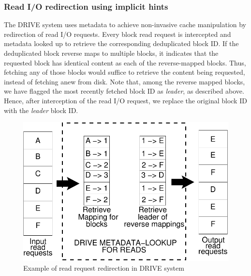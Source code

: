 
\subsubsection{Read I/O redirection using implicit hints}
The DRIVE system uses metadata to achieve non-invasive
cache manipulation by redirection of read I/O requests. Every block read
request is intercepted and metadata looked up to retrieve the corresponding
deduplicated block ID. If the
deduplicated block reverse maps to multiple blocks, it indicates that the 
requested block has identical content as each of the reverse-mapped blocks.
Thus, fetching any of those blocks would suffice to retrieve the content 
being requested, instead of fetching anew from disk. Note that, among the 
reverse mapped blocks, we have flagged the most recently fetched block ID as 
\textit{leader}, as described above. Hence, after interception of the read 
I/O request, we replace the original block ID with the \textit{leader} block ID.

\begin{figure}[t]
    \centering
    \includegraphics[scale=0.6]{confided-figures/main/dedup-working-reads.pdf}
    \caption{Example of read request redirection in DRIVE system}
    \label{fig:confided-working(a)}
\end{figure}

